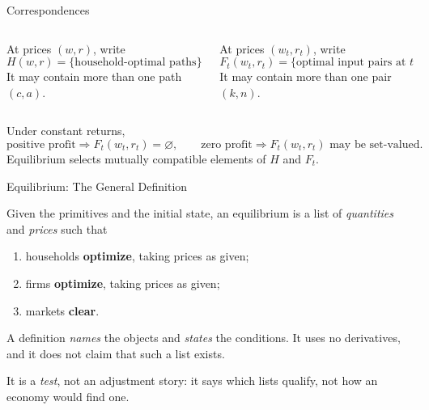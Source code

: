\documentclass[11pt,aspectratio=169,c]{beamer}
\begin{document}
\begin{frame}{Correspondences}
  \begin{columns}[t,onlytextwidth]
    \begin{column}{\tightcolumnwidth}
      \begin{definitionbox}
        \begin{minipage}[t][2.75cm][t]{\dimexpr\linewidth-.76em\relax}
          At prices $(w,r)$, write
          \[
            H(w,r)=\{\text{household-optimal paths}\}.
          \]
          It may contain more than one path $(c,a)$.
        \end{minipage}
      \end{definitionbox}
    \end{column}
    \hspace{\twocolumngutter}
    \begin{column}{\tightcolumnwidth}
      \begin{definitionbox}
        \begin{minipage}[t][2.75cm][t]{\dimexpr\linewidth-.76em\relax}
          At prices $(w_t,r_t)$, write
          \[
            F_t(w_t,r_t)=\{\text{optimal input pairs at }t\}.
          \]
          It may contain more than one pair $(k,n)$.
        \end{minipage}
      \end{definitionbox}
    \end{column}
  \end{columns}

  \vspace{.35em}
  Under constant returns,
  \[
    \text{positive profit}\Longrightarrow F_t(w_t,r_t)=\varnothing,
    \qquad
    \text{zero profit}\Longrightarrow F_t(w_t,r_t)\text{ may be set-valued}.
  \]
  Equilibrium selects mutually compatible elements of $H$ and $F_t$.
\end{frame}

\begin{frame}{Equilibrium: The General Definition}
  \begin{definitionbox}
    Given the primitives and the initial state, an equilibrium is a list of
    \emph{quantities} and \emph{prices} such that
    \begin{enumerate}
      \item households \textbf{optimize}, taking prices as given;
      \item firms \textbf{optimize}, taking prices as given;
      \item markets \textbf{clear}.
    \end{enumerate}
  \end{definitionbox}

  A definition \emph{names} the objects and \emph{states} the conditions. It
  uses no derivatives, and it does not claim that such a list exists.

  \vspace{.35em}
  It is a \emph{test}, not an adjustment story: it says which lists qualify,
  not how an economy would find one.
\end{frame}
\end{document}
